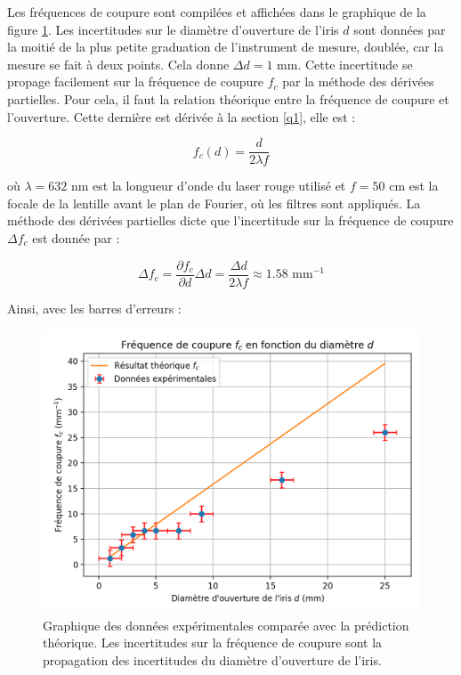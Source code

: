 \documentclass[11pt,letterpaper]{article}
\begin{document}
Les fréquences de coupure sont compilées et affichées dans le graphique de la figure \ref{plot}. Les incertitudes sur
le diamètre d'ouverture de l'iris $d$ sont données par la moitié de la plus petite graduation de l'instrument de mesure,
doublée, car la mesure se fait à deux points. Cela donne $\Delta d = 1$ mm. Cette incertitude se propage facilement sur
la fréquence de coupure $f_c$  par la méthode des dérivées partielles. Pour cela, il faut la relation théorique entre la
fréquence de coupure et l'ouverture. Cette dernière est dérivée à la section \ref{q1}, elle est :

\begin{equation}
  f_c(d)= \frac{d}{2\lambda f}
  \label{eqfcoup}
\end{equation}

où $\lambda = 632$ nm est la longueur d'onde du laser rouge utilisé et $f = 50$ cm est la focale de la lentille avant le
plan de Fourier, où les filtres sont appliqués. La méthode des dérivées partielles dicte que l'incertitude sur la
fréquence de coupure $\Delta f_c$ est donnée par :

\begin{equation}
  \Delta f_c = \frac{\partial f_c}{\partial d}\Delta d = \frac{\Delta d}{2 \lambda f} \approx 1.58 \text{ mm}^{-1} 
\end{equation}

Ainsi, avec les barres d'erreurs :

\begin{figure}[H]
  \centering
  \includegraphics[scale=0.9]{graph_fc.png}
  \caption{Graphique des données expérimentales comparée avec la prédiction théorique. Les incertitudes sur la fréquence
  de coupure sont la propagation des incertitudes du diamètre d'ouverture de l'iris.}
  \label{plot}
\end{figure}
\end{document}
